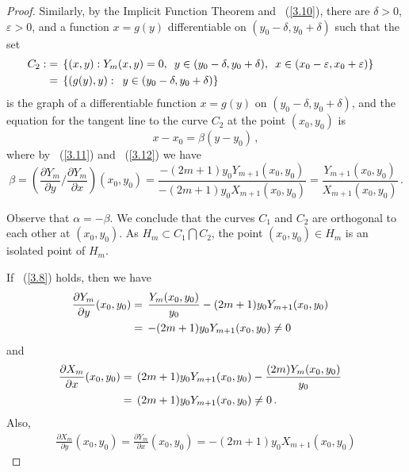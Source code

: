 \documentclass{article}
\theoremstyle{remark}
\numberwithin{equation}{section}
\begin{document}
\begin{proof}
Similarly, by the Implicit Function Theorem and ~(\ref{3.10}), there are $\delta > 0$, $\varepsilon > 0$, and a function $x = g(y)$
differentiable on $(y_0-\delta,y_0+\delta)$ such that the set
\begin{equation} \notag \begin{split} C_2 : & = \, \{(x,y): Y_m(x,y) = 0, \enskip y \in (y_0-\delta,y_0+\delta), \enskip x \in (x_0-\varepsilon,x_0+\varepsilon)\} \cr
& = \, \{(g(y),y): \enskip y \in (y_0-\delta,y_0+\delta)\} \cr \end{split}
\end{equation}
is the graph of a differentiable function $x = g(y)$ on $(y_0-\delta,y_0+\delta)$, and the equation for the tangent line to the curve $C_2$ at the point $(x_0,y_0)$ is
$$x-x_0 = \beta(y-y_0)\,,$$
where by ~(\ref{3.11}) and ~(\ref{3.12}) we have
$$\beta  = \left( \frac{\partial{Y_m}}{\partial y} \Big / \frac{\partial{Y_m}}{{\partial x}} \right)(x_0,y_0)
= \frac{-(2m+1)y_0Y_{m+1}(x_0,y_0)}{-(2m+1)y_0X_{m+1}(x_0,y_0)} = \frac{Y_{m+1}(x_0,y_0)}{X_{m+1}(x_0,y_0)}\,.$$

Observe that $\alpha = -\beta$. We conclude that the curves $C_1$ and $C_2$ are orthogonal to each other at $(x_0,y_0)$. As $H_m \subset C_1 \bigcap C_2$,
the point $(x_0,y_0) \in H_m$ is an isolated point of $H_m$.

If ~(\ref{3.8}) holds, then we have
\begin{equation}\label{3.13}\begin{split} \frac{\partial{Y_m}}{\partial y}(x_0,y_0) & = \, \frac{Y_m(x_0,y_0)}{y_0} - (2m+1)y_0Y_{m+1}(x_0,y_0) \cr
& = \, -(2m+1)y_0Y_{m+1}(x_0,y_0) \neq 0 \cr \end{split}
\end{equation}
and
\begin{equation}\label{3.14} \begin{split} \frac{\partial{X_m}}{\partial x}(x_0,y_0) & = \, (2m+1)y_0Y_{m+1}(x_0,y_0) - \frac{(2m)Y_m(x_0,y_0)}{y_0} \cr
& = \, (2m+1)y_0Y_{m+1}(x_0,y_0) \neq 0\,. \end{split}
\end{equation}
Also,
\begin{equation}\label{3.15} \begin{split} \frac{\partial{X_m}}{\partial y}(x_0,y_0) =  \frac{\partial{Y_m}}{\partial x}(x_0,y_0) = -(2m+1)y_0X_{m+1}(x_0,y_0) \end{split}
\end{equation}


\end{proof}
\end{document}
